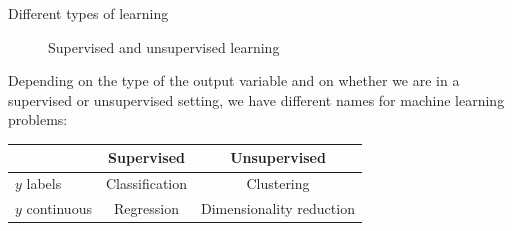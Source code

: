 \documentclass[xcolor=pdftex,dvipsnames,table]{beamer}
\begin{document}
\begin{frame}{Different types of learning}
	 \begin{figure}[htb]
   		\centering
   		 \hspace{1cm}
   		\caption{Supervised and unsupervised learning}
	 \end{figure}
	Depending on the type of the output variable and on whether we are in a supervised or unsupervised setting, we have different names for machine learning problems:
	\begin{table}
	\begin{tabular}{|l || c | c | }
		\hline
 		& Supervised & Unsupervised \\
		\hline \hline
		$y$ labels & Classification & Clustering \\
		$y$ continuous & Regression & Dimensionality reduction\\
		\hline
	\end{tabular}
	\end{table}
\end{frame}
\end{document}
